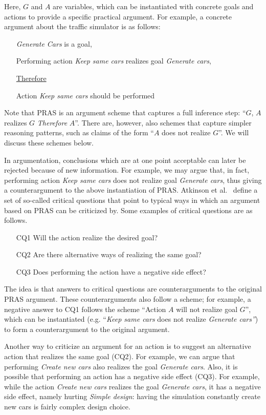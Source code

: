 Here, $G$ and $A$ are variables, which can be instantiated with concrete goals and actions to provide a specific practical argument. For example, a concrete argument about the traffic simulator is as follows: 
\begin{itemize}
\item[] \emph{Generate Cars} is a goal,
\item[] Performing action \emph{Keep same cars} realizes goal \emph{Generate cars}, 
\item[] \underline{Therefore} 
\item[] Action \emph{Keep same cars} should be performed
\end{itemize}

Note that PRAS is an argument scheme that captures a full inference step: ``$G$, $A$ realizes $G$ \emph{Therefore} $A$''. There are, however, also schemes that capture simpler reasoning patterns, such as claims of the form ``$A$ does not realize $G$''. We will discuss these schemes below. 

In argumentation, conclusions which are at one point acceptable can later be rejected because of new information. For example, we may argue that, in fact, performing action \emph{Keep same cars} does not realize goal \emph{Generate cars}, thus giving a counterargument to the above instantiation of PRAS. Atkinson et al.~\cite{atkinson2007} define a set of so-called critical questions that point to typical ways in which an argument based on PRAS can be criticized by. Some examples of critical questions are as follows.

\begin{enumerate}
\item[CQ1] Will the action realize the desired goal?
\item[CQ2] Are there alternative ways of realizing the same goal?
\item[CQ3] Does performing the action have a negative side effect?
\end{enumerate}

The idea is that answers to critical questions are counterarguments to the original PRAS argument. These counterarguments also follow a scheme; for example, a negative answer to CQ1 follows the scheme ``Action $A$ will not realize goal $G$'', which can be instantiated (e.g. ``\emph{Keep same cars} does not realize \emph{Generate cars''}) to form a counterargument to the original argument. 

Another way to criticize an argument for an action is to suggest an alternative action that realizes the same goal (CQ2). For example, we can argue that performing \emph{Create new cars} also realizes the goal \emph{Generate cars}. Also, it is possible that performing an action has a negative side effect (CQ3). For example, while the action \emph{Create new cars} realizes the goal \emph{Generate cars}, it has a negative side effect, namely hurting \emph{Simple design}: having the simulation constantly create new cars is fairly complex design choice. 

